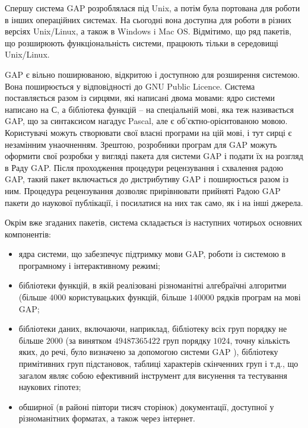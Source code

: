 Спершу система \textsf{GAP} розроблялася під Unix, а потім була портована для роботи в інших операційних системах. На сьогодні вона доступна для роботи в різних версіях Unix/Linux, а також в Windows i Mac OS. Відмітимо, що ряд пакетів, що розширюють функціональність системи, працюють тільки в середовищі Unix/Linux.

\textsf{GAP} є вільно поширюваною, відкритою і доступною для розширення системою. Вона поширюється у відповідності до GNU Public Licence. Система поставляється разом із сирцями, які написані двома мовами: ядро системи написано на С, а бібліотека функцій -- на спеціальній мові, яка теж називається \textsf{GAP}, що за синтаксисом нагадує Pascal, але є об'єктно-орієнтованою мовою. Користувачі можуть створювати свої власні програми на цій мові, і тут сирці є незамінним унаочненням. Зрештою, розробники програм для \textsf{GAP} можуть оформити свої розробки у вигляді пакета для системи \textsf{GAP} і подати їх на розгляд в Раду \textsf{GAP}. Після проходження процедури рецензування і схвалення радою \textsf{GAP}, такий пакет включається до дистрибутиву \textsf{GAP} і поширюється разом із ним. Процедура рецензування дозволяє прирівнювати прийняті Радою \textsf{GAP} пакети до наукової публікації, і посилатися на них так само, як і на інші джерела.

Окрім вже згаданих пакетів, система складається із наступних чотирьох основних компонентів:

\begin{itemize}[noitemsep,partopsep=0pt,topsep=0pt,parsep=0pt]
\item ядра системи, що забезпечує підтримку мови \textsf{GAP}, роботи із системою в програмному і інтерактивному режимі;
\item бібліотеки функцій, в якій реалізовані різноманітні алгебраїчні алгоритми (більше $4000$ користувацьких функцій, більше $140000$ рядків програм на мові \textsf{GAP};
\item бібліотеки даних, включаючи, наприклад, бібліотеку всіх груп порядку не більше $2000$ (за винятком $49487365422$ груп порядку $1024$, точну кількість яких, до речі, було визначено за допомогою системи \textsf{GAP} \cite{konovalov2014}), бібліотеку примітивних груп підстановок, таблиці характерів скінченних груп і т.д., що загалом являє собою ефективний інструмент для висунення та тестування наукових гіпотез;
\item обширної (в районі півтори тисяч сторінок) документації, доступної у різноманітних форматах, а також через інтернет.
\end{itemize}

